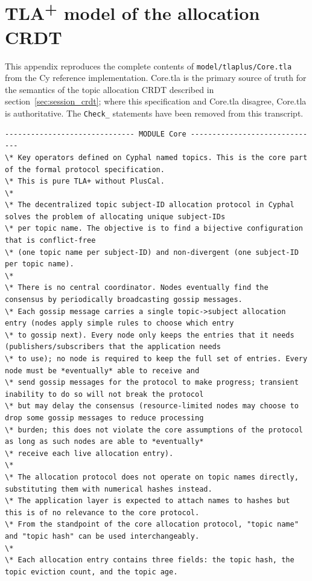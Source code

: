 \chapter{\texorpdfstring{TLA\textsuperscript{+}}{TLA+} model of the allocation CRDT}\label{sec:appendix_core_tla}

This appendix reproduces the complete contents of
\texttt{model/tlaplus/Core.tla} from the Cy reference implementation.
Core.tla is the primary source of truth for the semantics of the topic
allocation CRDT described in section~\ref{sec:session_crdt}; where this
specification and Core.tla disagree, Core.tla is authoritative.
The \verb|Check_| statements have been removed from this transcript.

\begin{verbatim}
------------------------------ MODULE Core ------------------------------
\* Key operators defined on Cyphal named topics. This is the core part of the formal protocol specification.
\* This is pure TLA+ without PlusCal.
\*
\* The decentralized topic subject-ID allocation protocol in Cyphal solves the problem of allocating unique subject-IDs
\* per topic name. The objective is to find a bijective configuration that is conflict-free
\* (one topic name per subject-ID) and non-divergent (one subject-ID per topic name).
\*
\* There is no central coordinator. Nodes eventually find the consensus by periodically broadcasting gossip messages.
\* Each gossip message carries a single topic->subject allocation entry (nodes apply simple rules to choose which entry
\* to gossip next). Every node only keeps the entries that it needs (publishers/subscribers that the application needs
\* to use); no node is required to keep the full set of entries. Every node must be *eventually* able to receive and
\* send gossip messages for the protocol to make progress; transient inability to do so will not break the protocol
\* but may delay the consensus (resource-limited nodes may choose to drop some gossip messages to reduce processing
\* burden; this does not violate the core assumptions of the protocol as long as such nodes are able to *eventually*
\* receive each live allocation entry).
\*
\* The allocation protocol does not operate on topic names directly, substituting them with numerical hashes instead.
\* The application layer is expected to attach names to hashes but this is of no relevance to the core protocol.
\* From the standpoint of the core allocation protocol, "topic name" and "topic hash" can be used interchangeably.
\*
\* Each allocation entry contains three fields: the topic hash, the topic eviction count, and the topic age.

\end{verbatim}
